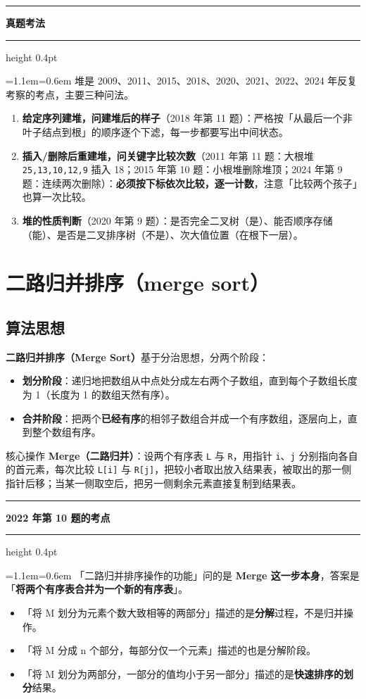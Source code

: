 \documentclass[11pt,openany,UTF8]{ctexbook}
\newcommand{\callouthead}[2]{%
  \par\addvspace{7pt}\noindent
  {\color{#1}\rule[-0.15em]{3pt}{1.05em}}\hspace{0.5em}%
  {\bfseries\color{#1}#2}\par\nobreak\vspace{-0.35em}%
  {\color{rulesep}\hrule height 0.4pt}\nobreak\vspace{0.45em}%
  \begingroup\small\setlength{\parindent}{0pt}%
  \leftskip=1.1em\rightskip=0.6em\noindent\ignorespaces}
\newcommand{\calloutend}{\par\endgroup\addvspace{7pt}}
\newenvironment{callkey}[1]{\callouthead{keybar}{#1}}{\calloutend}
\newenvironment{callexam}[1]{\callouthead{exambar}{#1}}{\calloutend}
\begin{document}
\begin{callexam}{真题考法}
堆是 2009、2011、2015、2018、2020、2021、2022、2024 年反复考察的考点，主要三种问法。

\begin{enumerate}
\item \textbf{给定序列建堆，问建堆后的样子}（2018 年第 11 题）：严格按「从最后一个非叶子结点到根」的顺序逐个下滤，每一步都要写出中间状态。
\item \textbf{插入/删除后重建堆，问关键字比较次数}（2011 年第 11 题：大根堆 \texttt{25,\allowbreak{}13,\allowbreak{}10,\allowbreak{}12,\allowbreak{}9} 插入 18；2015 年第 10 题：小根堆删除堆顶；2024 年第 9 题：连续两次删除）：\textbf{必须按下标依次比较，逐一计数}，注意「比较两个孩子」也算一次比较。
\item \textbf{堆的性质判断}（2020 年第 9 题）：是否完全二叉树（是）、能否顺序存储（能）、是否是二叉排序树（不是）、次大值位置（在根下一层）。
\end{enumerate}
\end{callexam}

\section{二路归并排序（merge sort）}

\subsection{算法思想}

\textbf{二路归并排序（Merge Sort）}基于分治思想，分两个阶段：

\begin{itemize}
\item \textbf{划分阶段}：递归地把数组从中点处分成左右两个子数组，直到每个子数组长度为 1（长度为 1 的数组天然有序）。
\item \textbf{合并阶段}：把两个\textbf{已经有序}的相邻子数组合并成一个有序数组，逐层向上，直到整个数组有序。
\end{itemize}
核心操作 \textbf{Merge（二路归并）}：设两个有序表 \texttt{L} 与 \texttt{R}，用指针 \texttt{i}、\texttt{j} 分别指向各自的首元素，每次比较 \texttt{L[i]\allowbreak{}} 与 \texttt{R[j]\allowbreak{}}，把较小者取出放入结果表，被取出的那一侧指针后移；当某一侧取空后，把另一侧剩余元素直接复制到结果表。

\begin{callkey}{2022 年第 10 题的考点}
「二路归并排序操作的功能」问的是 \textbf{Merge 这一步本身}，答案是「\textbf{将两个有序表合并为一个新的有序表}」。

\begin{itemize}
\item 「将 M 划分为元素个数大致相等的两部分」描述的是\textbf{分解}过程，不是归并操作。
\item 「将 M 分成 n 个部分，每部分仅一个元素」描述的也是分解阶段。
\item 「将 M 划分为两部分，一部分的值均小于另一部分」描述的是\textbf{快速排序的划分}结果。
\end{itemize}
\end{callkey}
\end{document}
